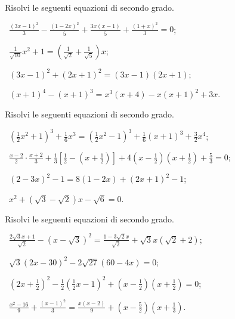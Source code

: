 \begin{esercizio}[\Ast]
 \label{ese:3.24}
Risolvi le seguenti equazioni di secondo grado.
 \begin{enumeratea}
 \item~$\frac{(3 x-1)^{2}}{3}-\frac{(1-2 x)^{2}}{5} + \frac{3 x (x-1)}{5} + \frac{(1 + x)^{2}}{3} = 0$;
 \item~$\frac{1}{\sqrt{10}} x^{2} + 1 = \left(\frac{1}{\sqrt{2}} +\frac{1}{\sqrt{5}} \right) x$;
 \item~$(3 x-1)^{2} + (2 x + 1)^{2} = (3 x-1) (2 x + 1)$;
 \item~$(x + 1)^{4}-(x + 1)^{3} = x^{3} (x + 4)-x (x + 1)^{2} + 3 x$.
 \end{enumeratea}
\end{esercizio}

\begin{esercizio}[\Ast]
 \label{ese:3.25}
Risolvi le seguenti equazioni di secondo grado.
 \begin{enumeratea}
 \item~$\left(\frac{1}{2} x^{2} + 1 \right)^{3} + \frac{1}{6} x^{3} = \left(\frac{1}{2} x^{2}-1 \right)^{3} + \frac{1}{6} (x + 1)^{3} + \frac{3}{2} x^{4}$;
 \item~$\frac{x-2}{2} \cdot \frac{x + 2}{3} + \frac{1}{3} \left[\frac{1}{2}-\left(x + \frac{1}{2} \right) \right] + 4 \left(x -\frac{1}{2} \right) \left(x + \frac{1}{2} \right) + \frac{5}{3} = 0$;
 \item~$(2-3 x)^{2}-1 = 8 (1-2 x) + (2 x + 1)^{2}-1$;
 \item~$x^{2} + \left(\sqrt{3}-\sqrt{2} \right) x-\sqrt{6} = 0$.
 \end{enumeratea}
\end{esercizio}

\begin{esercizio}[\Ast]
 \label{ese:3.26}
Risolvi le seguenti equazioni di secondo grado.
 \begin{enumeratea}
 \item~$\frac{2 \sqrt{3} x + 1}{\sqrt{2}}-\left(x-\sqrt{3} \right)^{2} = \frac{1-3 \sqrt{2} x}{\sqrt{2}} + \sqrt{3} x \left(\sqrt{2}+ 2 \right)$;
 \item~$\sqrt{3} (2 x-30)^{2}-2 \sqrt{27} (60-4 x) = 0$;
 \item~$\left(2 x + \frac{1}{2} \right)^{2}-\frac{1}{2} \left(\frac{1}{2} x-1 \right)^{2} + \left(x-\frac{1}{2} \right) \left(x + \frac{1}{2} \right) = 0$;
 \item~$\frac{x^{2}-16}{9} + \frac{(x-1)^{2}}{3} = \frac{x (x -2)}{9} + \left(x-\frac{5}{2} \right) \left(x + \frac{1}{3}\right)$.
 \end{enumeratea}
\end{esercizio}

